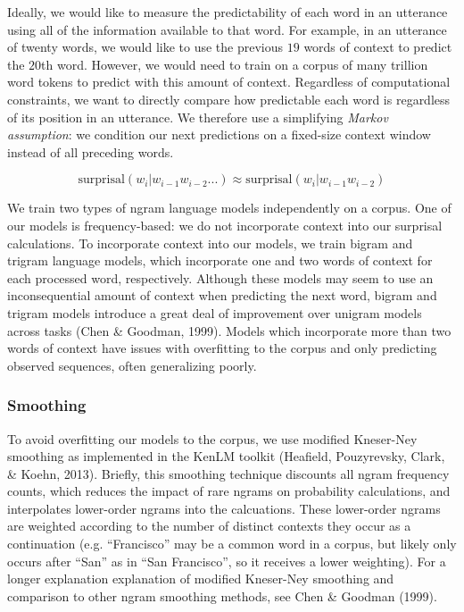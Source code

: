 \documentclass[10pt, letterpaper]{article}
\begin{document}
Ideally, we would like to measure the predictability of each word in an
utterance using all of the information available to that word. For
example, in an utterance of twenty words, we would like to use the
previous \(19\) words of context to predict the \(20\)th word. However,
we would need to train on a corpus of many trillion word tokens to
predict with this amount of context. Regardless of computational
constraints, we want to directly compare how predictable each word is
regardless of its position in an utterance. We therefore use a
simplifying \emph{Markov assumption}: we condition our next predictions
on a fixed-size context window instead of all preceding words.

\[\text{surprisal}(w_i|w_{i-1}w_{i-2}...) \approx \text{surprisal}(w_i|w_{i-1}w_{i-2})\]

We train two types of ngram language models independently on a corpus.
One of our models is frequency-based: we do not incorporate context into
our surprisal calculations. To incorporate context into our models, we
train bigram and trigram language models, which incorporate one and two
words of context for each processed word, respectively. Although these
models may seem to use an inconsequential amount of context when
predicting the next word, bigram and trigram models introduce a great
deal of improvement over unigram models across tasks (Chen \& Goodman,
1999). Models which incorporate more than two words of context have
issues with overfitting to the corpus and only predicting observed
sequences, often generalizing poorly.

\hypertarget{smoothing}{%
\subsubsection{Smoothing}\label{smoothing}}

To avoid overfitting our models to the corpus, we use modified
Kneser-Ney smoothing as implemented in the KenLM toolkit (Heafield,
Pouzyrevsky, Clark, \& Koehn, 2013). Briefly, this smoothing technique
discounts all ngram frequency counts, which reduces the impact of rare
ngrams on probability calculations, and interpolates lower-order ngrams
into the calcuations. These lower-order ngrams are weighted according to
the number of distinct contexts they occur as a continuation (e.g.
``Francisco'' may be a common word in a corpus, but likely only occurs
after ``San'' as in ``San Francisco'', so it receives a lower
weighting). For a longer explanation explanation of modified Kneser-Ney
smoothing and comparison to other ngram smoothing methods, see Chen \&
Goodman (1999).
\end{document}
